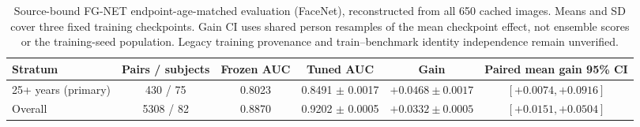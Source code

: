 \begin{table}[!t]
\caption{Source-bound FG-NET endpoint-age-matched evaluation (FaceNet), reconstructed from all 650 cached images. Means and SD cover three fixed training checkpoints. Gain CI uses shared person resamples of the mean checkpoint effect, not ensemble scores or the training-seed population. Legacy training provenance and train--benchmark identity independence remain unverified.}
\label{tab:endpoint}
\centering\footnotesize
\begin{tabular}{@{}lccccc@{}}
\toprule
Stratum & Pairs / subjects & Frozen AUC & Tuned AUC & Gain & Paired mean gain 95\% CI \\
\midrule
25+ years (primary) & 430 / 75 & 0.8023 & 0.8491 $\pm$ 0.0017 & $+0.0468\pm0.0017$ & $[+0.0074,+0.0916]$ \\
Overall & 5308 / 82 & 0.8870 & 0.9202 $\pm$ 0.0005 & $+0.0332\pm0.0005$ & $[+0.0151,+0.0504]$ \\
\bottomrule
\end{tabular}
\end{table}
